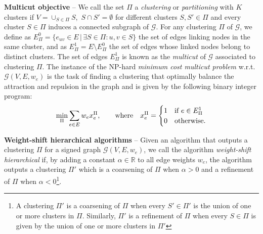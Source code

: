 \textbf{Multicut objective} -- We call the set $\Pi$ a \emph{clustering} or \emph{partitioning} with $K$ clusters if $V = \cup_{S\in\Pi} S $, $\,S \cap S' = \emptyset$ for different clusters $S, S'\in \Pi$ and every cluster $S \in \Pi$ induces a connected subgraph of $\mathcal{G}$. 
For any clustering $\Pi$ of $\mathcal{G}$, we define as $E^0_\Pi= \{ e_{uv} \in E \,|\, \exists S \in \Pi : u,v \in S \}$ the set of edges linking nodes in the same cluster, and as $E_\Pi^1= E \setminus E^0_\Pi$ the set of edges whose linked nodes belong to distinct clusters.
The set of edges $E_\Pi^1$ is known as the \emph{multicut} of $\mathcal{G}$ associated to clustering $\Pi$. The instance of the NP-hard \emph{minimum cost multicut problem} w.r.t. $\mathcal{G}(V,E,w_e)$ is the task of finding a clustering that optimally balance the attraction and repulsion in the graph and is given by the following binary integer program:
\begin{equation}
 \min_\Pi \sum_{e\in E} w_e x_e^\Pi,  \qquad \text{where} \quad x^\Pi_e = 
 \begin{cases} 
 1 & \text{if } e\in E^1_\Pi \\
 0 & \text{otherwise}.
 \end{cases}
\end{equation}


\textbf{Weight-shift hierarchical algorithms} -- Given an algorithm that outputs a clustering $\Pi$ for a signed graph $\mathcal{G}(V,E,w_e)$, we call the algorithm \emph{weight-shift hierarchical} if, by adding a constant $\alpha \in \mathbb{R}$ to all edge weights $w_e$, the algorithm outputs a clustering $\Pi'$ which is a coarsening of $\Pi$ when $\alpha>0$ and a refinement of $\Pi$ when $\alpha<0$\footnote{A clustering $\Pi'$ is a coarsening of $\Pi$ when every $S' \in \Pi'$ is the union of one or more clusters in $\Pi$. Similarly, $\Pi'$ is a refinement of $\Pi$ when every $S \in \Pi$ is given by the union of one or more clusters in $\Pi'$}.

